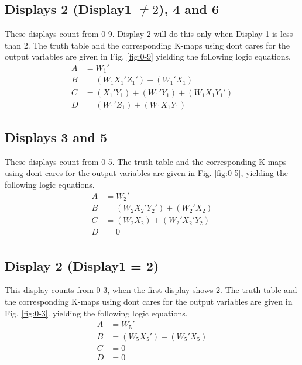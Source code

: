 

\subsection{Displays 2 (Display1 $\ne 2$), 4 and 6}
These displays count from 0-9.  Display 2 will do this only when Display 1 is less than 2.
The truth table 
and the corresponding K-maps using dont cares for the output variables are given in 
Fig. \ref{fig:0-9}
yielding the following logic equations.
\begin{align}
    A &= W_1' \\
    B &= (W_1 X_1' Z_1') + (W_1' X_1) \\
    C &= (X_1' Y_1) + (W_1' Y_1) + (W_1 X_1 Y_1') \\
    D &= (W_1' Z_1) + (W_1 X_1 Y_1) 
\end{align}

\subsection{Displays 3 and 5}
These displays count from 0-5.  
The truth table 
and the corresponding K-maps using dont cares for the output variables are given in 
Fig. \ref{fig:0-5},
yielding the following logic equations.
\begin{align}
    A &= W_2' \\
    B &= (W_2 X_2' Y_2') + (W_2' X_2) \\
    C &= (W_2 X_2) + (W_2' X_2' Y_2) \\
    D &= 0 \\
\end{align}

\subsection{Display 2 (Display1 = 2)}
This display counts from 0-3, when the first display shows 2.  
The truth table 
and the corresponding K-maps using dont cares for the output variables are given in 
Fig. \ref{fig:0-3}.
yielding the following logic equations.
\begin{align}
    A &= W_5' \\
    B &= (W_5 X_5') + (W_5' X_5) \\
    C &= 0 \\
    D &= 0 
\end{align}
%

